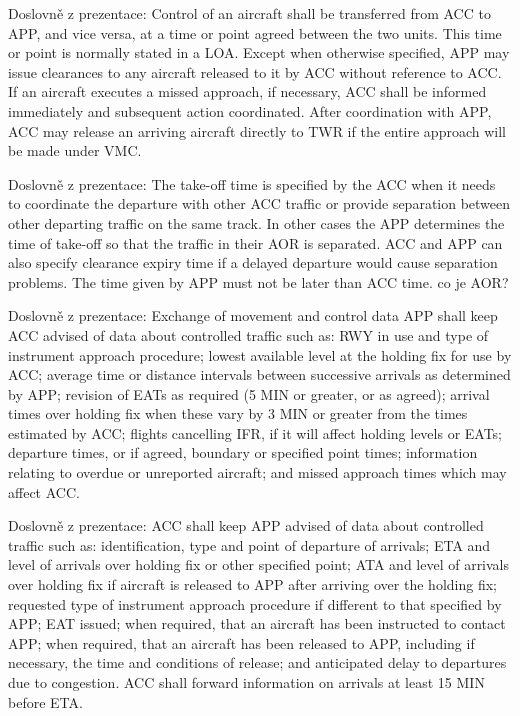 Doslovně z prezentace:
Control of an aircraft shall be transferred from ACC to APP, and vice versa, at a time or point agreed between the two units. This time or point is normally stated in a LOA.
Except when otherwise specified, APP may issue clearances to any aircraft released to it by ACC without reference to ACC. If an aircraft executes a missed approach, if necessary, ACC shall be informed immediately and subsequent action coordinated. 
After coordination with APP, ACC may release an arriving aircraft directly to TWR if the entire approach will be made under VMC.\cite[Chapter 10.1.3.1]{doc4444}

Doslovně z prezentace:
The take-off time is specified by the ACC when it needs to coordinate the departure with other ACC traffic or provide separation between other departing traffic on the same track. In other cases the APP determines the time of take-off so that the traffic in their AOR is separated. ACC and APP can also specify clearance expiry time if a delayed departure would cause separation problems. The time given by APP must not be later than ACC time. co je AOR?\cite[Chapter 10.1.3.2]{doc4444}

Doslovně z prezentace:
Exchange of movement and control data
APP shall keep ACC advised of data about controlled traffic such as:
RWY in use and type of instrument approach procedure;
lowest available level at the holding fix for use by ACC;
average time or distance intervals between successive arrivals as determined by APP;
revision of EATs as required (5 MIN or greater, or as agreed);
arrival times over holding fix when these vary by 3 MIN or greater from the times estimated by ACC;
flights cancelling IFR, if it will affect holding levels or EATs;
departure times, or if agreed, boundary or specified point times;
information relating to overdue or unreported aircraft; and
missed approach times which may affect ACC.
\cite[Chapter 10.1.3.3]{doc4444}

Doslovně z prezentace:
ACC shall keep APP advised of data about controlled traffic such as:
identification, type and point of departure of arrivals;
ETA and level of arrivals over holding fix or other specified point;
ATA and level of arrivals over holding fix if aircraft is released to APP after arriving over the holding fix;
requested type of instrument approach procedure if different to that specified by APP;
EAT issued;
when required, that an aircraft has been instructed to contact APP;
when required, that an aircraft has been released to APP, including if necessary, the time and conditions of release; and
anticipated delay to departures due to congestion.
ACC shall forward information on arrivals at least 15 MIN before ETA. \cite[Chapter 10.1.3.3]{doc4444}

